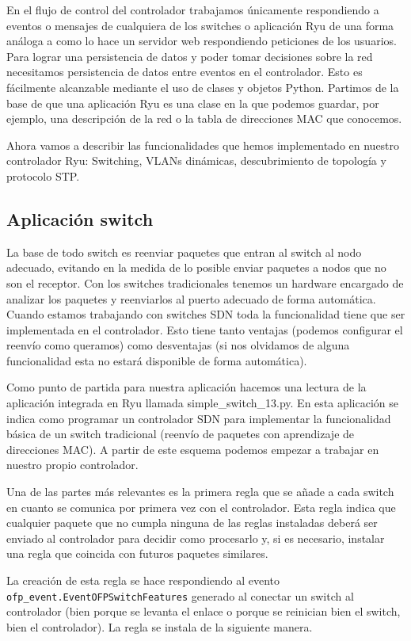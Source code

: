 En el flujo de control del controlador trabajamos únicamente respondiendo a eventos o mensajes de cualquiera de los switches o aplicación Ryu de una forma análoga a como lo hace un servidor web respondiendo peticiones de los usuarios. Para lograr una persistencia de datos y poder tomar decisiones sobre la red necesitamos persistencia de datos entre eventos en el controlador. Esto es fácilmente alcanzable mediante el uso de clases y objetos Python. Partimos de la base de que una aplicación Ryu es una clase en la que podemos guardar, por ejemplo, una descripción de la red o la tabla de direcciones MAC que conocemos.

Ahora vamos a describir las funcionalidades que hemos implementado en nuestro controlador Ryu: Switching, VLANs dinámicas, descubrimiento de topología y protocolo STP.

\subsection{Aplicación switch}

La base de todo switch es reenviar paquetes que entran al switch al nodo adecuado, evitando en la medida de lo posible enviar paquetes a nodos que no son el receptor. Con los switches tradicionales tenemos un hardware encargado de analizar los paquetes y reenviarlos al puerto adecuado de forma automática. Cuando estamos trabajando con switches SDN toda la funcionalidad tiene que ser implementada en el controlador. Esto tiene tanto ventajas (podemos configurar el reenvío como queramos) como desventajas (si nos olvidamos de alguna funcionalidad esta no estará disponible de forma automática).

Como punto de partida para nuestra aplicación hacemos una lectura de la aplicación integrada en Ryu llamada simple\_switch\_13.py. En esta aplicación se indica como programar un controlador SDN para implementar la funcionalidad básica de un switch tradicional (reenvío de paquetes con aprendizaje de direcciones MAC). A partir de este esquema podemos empezar a trabajar en nuestro propio controlador.

Una de las partes más relevantes es la primera regla que se añade a cada switch en cuanto se comunica por primera vez con el controlador. Esta regla indica que cualquier paquete que no cumpla ninguna de las reglas instaladas deberá ser enviado al controlador para decidir como procesarlo y, si es necesario, instalar una regla que coincida con futuros paquetes similares.

La creación de esta regla se hace respondiendo al evento \lstinline{ofp_event.EventOFPSwitchFeatures} generado al conectar un switch al controlador (bien porque se levanta el enlace o porque se reinician bien el switch, bien el controlador). La regla se instala de la siguiente manera.

